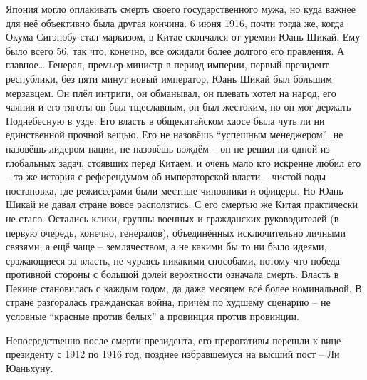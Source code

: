 Япония могло оплакивать смерть своего государственного мужа, но куда важнее для неё объективно была другая кончина. 6 июня 1916, почти тогда же, когда Окума Сигэнобу стал маркизом, в Китае скончался от уремии Юань Шикай. Ему было всего 56, так что, конечно, все ожидали более долгого его правления. А главное… Генерал, премьер-министр в период империи, первый президент республики, без пяти минут новый император, Юань Шикай был большим мерзавцем. Он плёл интриги, он обманывал, он плевать хотел на народ, его чаяния и его тяготы он был тщеславным, он был жестоким, но он мог держать Поднебесную в узде. Его власть в общекитайском хаосе была чуть ли ни единственной прочной вещью. Его не назовёшь “успешным менеджером”, не назовёшь лидером нации, не назовёшь вождём – он не решил ни одной из глобальных задач, стоявших перед Китаем, и очень мало кто искренне любил его – та же история с референдумом об императорской власти – чистой воды постановка, где режиссёрами были местные чиновники и офицеры. Но Юань Шикай не давал стране вовсе расползтись. С его смертью же Китая практически не стало. Остались клики, группы военных и гражданских руководителей (в первую очередь, конечно, генералов), объединённых исключительно личными связями, а ещё чаще – землячеством, а не какими бы то ни было идеями, сражающиеся за власть, не чураясь никакими способами, потому что победа противной стороны с большой долей вероятности означала смерть. Власть в Пекине становилась с каждым годом, да даже месяцем всё более номинальной. В стране разгоралась гражданская война, причём по худшему сценарию – не условные “красные против белых” а провинция против провинции.

Непосредственно после смерти президента, его прерогативы перешли к вице-президенту с 1912 по 1916 год, позднее избравшемуся на высший пост – Ли Юаньхуну. 

